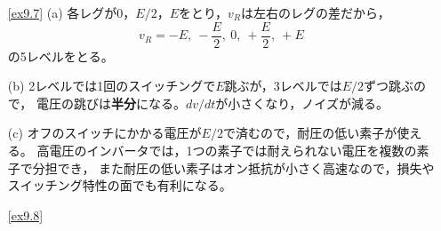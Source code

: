 \begin{enumerate}
(b) 必要な$LC$の積は
\begin{equation*}
LC = \frac{1}{(2\pi f_0)^2} = \frac{1}{(2\pi\times10^3)^2} \approx 2.5\times10^{-8}\,\mathrm{s^2}
\end{equation*}
である。$L$と$C$の配分は負荷で決める。$L = 2.5$\,mH，$C = 10\,\mathrm{\mu F}$と選べば，
$\sqrt{L/C} \approx 16\,\Omega$，$LC = 2.5\times10^{-8}\,\mathrm{s^2}$となって条件を満たす。
5章の降圧コンバータのフィルタ（\ref{sec5.2}節）と比べると，遮るべき周波数が同じ$20$\,kHzでも，
通すべきものが直流ではなく$50$\,Hzの基本波である点だけが違う。

(c) 高調波が$40$\,kHz付近に移るので，同じ減衰なら$f_0$を$2$\,kHzに上げられ，$LC$は$1/4$で済む。
エネルギーの視点で言えば，このフィルタは搬送波の1周期ごとに$L$が電流の凸凹を，$C$が電圧の凸凹を蓄えては吐き出し，
$50$\,Hzのゆるやかな流れだけを負荷へ渡している。
搬送波周波数を高くするほど1周期に蓄える量が減るので，$L$と$C$は小さくて済む。

\item[\ref{ex9.7}]
(a) 各レグが$0$，$E/2$，$E$をとり，$v_R$は左右のレグの差だから，
\begin{equation*}
v_R = -E,\ -\frac{E}{2},\ 0,\ +\frac{E}{2},\ +E
\end{equation*}
の5レベルをとる。

(b) 2レベルでは1回のスイッチングで$E$跳ぶが，3レベルでは$E/2$ずつ跳ぶので，
電圧の跳びは\textbf{半分}になる。$dv/dt$が小さくなり，ノイズが減る。

(c) オフのスイッチにかかる電圧が$E/2$で済むので，耐圧の低い素子が使える。
高電圧のインバータでは，1つの素子では耐えられない電圧を複数の素子で分担でき，
また耐圧の低い素子はオン抵抗が小さく高速なので，損失やスイッチング特性の面でも有利になる。

\item[\ref{ex9.8}]


\end{enumerate}
